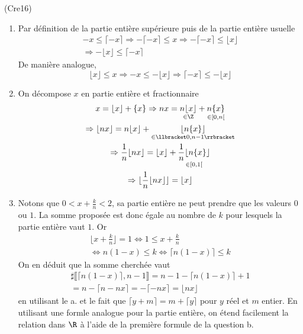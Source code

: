 \begin{tiny}(Cre16)\end{tiny}
\begin{enumerate}
 \item Par définition de la partie entière supérieure puis de la partie entière usuelle 
\begin{multline*}
-x \leq \lceil -x \rceil \Rightarrow - \lceil -x \rceil \leq x
\Rightarrow - \lceil -x \rceil \leq \lfloor x \rfloor\\
\Rightarrow - \lfloor x \rfloor \leq \lceil -x \rceil
\end{multline*}
De manière analogue,
\begin{displaymath}
\lfloor x \rfloor \leq x \Rightarrow  -x\leq - \lfloor x \rfloor 
\Rightarrow  \lceil -x \rceil \leq  -\lfloor x \rfloor
\end{displaymath}
\item On décompose $x$ en partie entière et fractionnaire
\begin{multline*}
 x = \lfloor x \rfloor + \{x\}\Rightarrow nx = \underset{\in \Z}{n\lfloor x \rfloor} + \underset{\in [0,n[}{n\{x\}}\\
\Rightarrow \lfloor nx \rfloor = n\lfloor x \rfloor + \underset{\in \llbracket 0,n-1\rrbracket }{\lfloor n\{x\}\rfloor}\\
\Rightarrow \frac{1}{n} \lfloor nx \rfloor = \lfloor x \rfloor + \underset{\in [0,1[}{\frac{1}{n}\lfloor n\{x\}\rfloor}\\
\Rightarrow \lfloor \frac{1}{n} \lfloor nx \rfloor \rfloor = \lfloor x \rfloor
\end{multline*}
\item Notons que $0< x+\frac{k}{n}<2$, sa partie entière ne peut prendre que les valeurs $0$ ou $1$. La somme proposée est donc égale au nombre de $k$ pour lesquels la partie entière vaut $1$. Or
\begin{multline*}
 \lfloor x+\frac{k}{n} \rfloor =1
\Leftrightarrow 1\leq x+\frac{k}{n} \\
\Leftrightarrow n(1-x)\leq k \Leftrightarrow \lceil n(1-x) \rceil \leq k 
\end{multline*}
On en déduit que la somme cherchée vaut
\begin{multline*}
 \sharp \llbracket \lceil n(1-x) \rceil , n-1 \rrbracket
= n-1 - \lceil n(1-x) \rceil +1 \\
= n - \lceil n -nx \rceil
= - \lceil -nx \rceil = \lfloor nx \rfloor
\end{multline*}
en utilisant le a. et le fait que $\lceil y+m \rceil = m+\lceil y \rceil$ pour $y$ réel et $m$ entier. En utilisant une formle analogue pour la partie entière, on étend facilement la relation dans $\R$ à l'aide de la première formule de la question b.
\end{enumerate}
